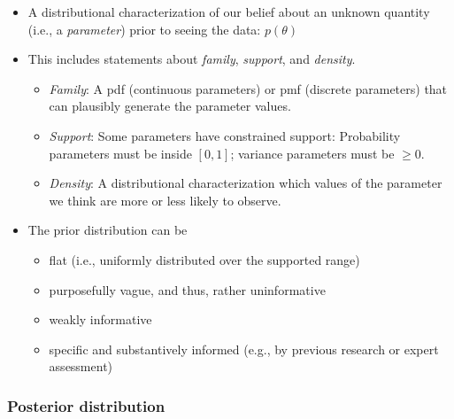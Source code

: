 \documentclass[
  11pt,
]{article}
\providecommand{\tightlist}{%
  \setlength{\itemsep}{0pt}\setlength{\parskip}{0pt}}
\begin{document}
\begin{itemize}
\tightlist
\item
  A distributional characterization of our belief about an unknown
  quantity (i.e., a \emph{parameter}) prior to seeing the data: \(p(\theta)\)
\item
  This includes statements about \emph{family}, \emph{support}, and \emph{density}.

  \begin{itemize}
  \tightlist
  \item
    \emph{Family}: A pdf (continuous parameters) or pmf (discrete
    parameters) that can plausibly generate the parameter values.
  \item
    \emph{Support}: Some parameters have constrained support: Probability
    parameters must be inside \([0, 1]\); variance parameters must be
    \(\geq 0\).
  \item
    \emph{Density}: A distributional characterization which values of the
    parameter we think are more or less likely to observe.
  \end{itemize}
\item
  The prior distribution can be

  \begin{itemize}
  \tightlist
  \item
    flat (i.e., uniformly distributed over the supported range)
  \item
    purposefully vague, and thus, rather uninformative
  \item
    weakly informative
  \item
    specific and substantively informed (e.g., by previous research
    or expert assessment)
  \end{itemize}
\end{itemize}

\hypertarget{posterior-distribution}{%
\subsubsection{Posterior distribution}\label{posterior-distribution}}
\end{document}
